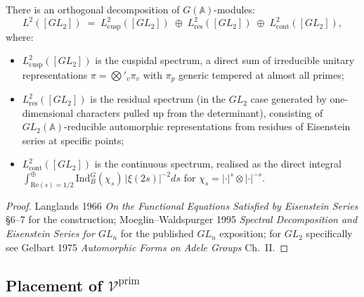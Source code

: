 \begin{theorem}
\label{v4-arith:kms-gns:thm:spectral-decomposition}
There is an orthogonal decomposition of
\(G(\mathbb{A})\)-modules:
\begin{equation}
\label{v4-arith:kms-gns:eq:L2-decomposition}
L^{2}([GL_{2}])\;=\;L^{2}_{\mathrm{cusp}}([GL_{2}])\;\oplus\;L^{2}_{\mathrm{res}}([GL_{2}])\;\oplus\;L^{2}_{\mathrm{cont}}([GL_{2}]),
\end{equation}
where:
\begin{itemize}
\item \(L^{2}_{\mathrm{cusp}}([GL_{2}])\) is the cuspidal spectrum,
a direct sum of irreducible unitary representations
\(\pi=\bigotimes'_{v}\pi_{v}\) with \(\pi_{p}\) generic tempered at
almost all primes;
\item \(L^{2}_{\mathrm{res}}([GL_{2}])\) is the residual spectrum
(in the \(GL_{2}\) case generated by one-dimensional characters
pulled up from the determinant), consisting of \(GL_{2}(\mathbb{A})\)-reducible
automorphic representations from residues of Eisenstein series at
specific points;
\item \(L^{2}_{\mathrm{cont}}([GL_{2}])\) is the continuous spectrum,
realised as the direct integral
\(\int^{\oplus}_{\mathrm{Re}(s)=1/2}\mathrm{Ind}_{B}^{G}(\chi_{s})\,|\xi(2s)|^{-2}ds\)
for \(\chi_{s}=|\cdot|^{s}\otimes|\cdot|^{-s}\).
\end{itemize}
\end{theorem}

\begin{proof}
Langlands 1966 \emph{On the Functional Equations Satisfied by
Eisenstein Series} \S6--7 for the construction; Moeglin--Waldspurger
1995 \emph{Spectral Decomposition and Eisenstein Series for \(GL_{n}\)}
for the published \(GL_{n}\) exposition; for \(GL_{2}\) specifically see
Gelbart 1975 \emph{Automorphic Forms on Adele Groups} Ch.~II.
\end{proof}

\subsection{Placement of \(\mathcal{V}^{\mathrm{prim}}\)}
\label{v4-arith:kms-gns:cycle3:placement}

